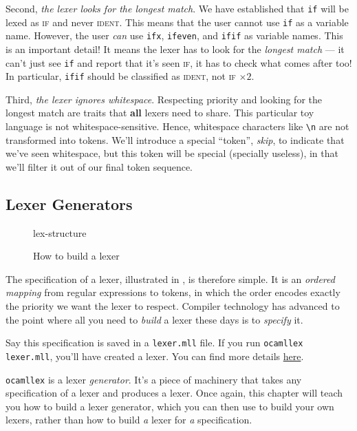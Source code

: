 Second, \emph{the lexer looks for the longest match}. We have established that \texttt{if} will be lexed as \textsc{if} and never \textsc{ident}. This means that the user cannot use \texttt{if} as a variable name. However, the user \emph{can} use \texttt{ifx}, \texttt{ifeven}, and \texttt{ifif} as variable names. This is an important detail! It means the lexer has to look for the \emph{longest match} --- it can't just see \texttt{if} and report that it's seen \textsc{if}, it has to check what comes after too! In particular, \texttt{ifif} should be classified as \textsc{ident}, not \textsc{if} $\times 2$.

Third, \emph{the lexer ignores whitespace}. Respecting priority and looking for the longest match are traits that \textbf{all} lexers need to share. This particular toy language is not whitespace-sensitive. Hence, whitespace characters like \verb|\n| are not transformed into tokens. We'll introduce a special ``token'', \emph{skip}, to indicate that we've seen whitespace, but this token will be special (specially useless), in that we'll filter it out of our final token sequence. 

\subsection{Lexer Generators}
\begin{figure}[H]
    \begin{center}
        {lex-structure}
    \end{center}
    \caption{How to build a lexer}
    \label{fig:build-lexer}
\end{figure}

The specification of a lexer, illustrated in , is therefore simple. It is an \emph{ordered mapping} from regular expressions to tokens, in which the order encodes exactly the priority we want the lexer to respect. Compiler technology has advanced to the point where all you need to \textit{build} a lexer these days is to \textit{specify} it.

Say this specification is saved in a \texttt{lexer.mll} file. If you run \texttt{ocamllex lexer.mll}, you'll have created a lexer. You can find more details \href{https://ocaml.org/manual/5.2/lexyacc.html}{here}.

\texttt{ocamllex} is a lexer \emph{generator}. It's a piece of machinery that takes any specification of a lexer and produces a lexer. Once again, this chapter will teach you how to build a lexer generator, which you can then use to build your own lexers, rather than how to build \textit{a} lexer for \textit{a} specification.

